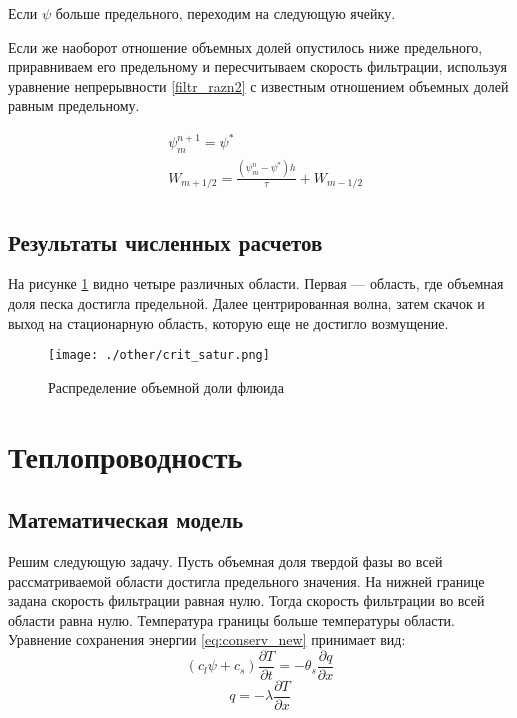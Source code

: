 \documentclass[12pt,a4paper]{article}
\newcommand{\pd}[2]{\frac{\partial #1}{\partial #2}}
\begin{document}
Если $\psi$ больше предельного, переходим на следующую ячейку.

Если же наоборот отношение объемных долей опустилось ниже предельного, приравниваем его предельному и пересчитываем скорость фильтрации, используя уравнение непрерывности \eqref{filtr_razn2} с известным отношением объемных долей равным предельному.

\begin{equation}
\begin{aligned} 
&\psi_{m}^{n+1} = \psi^* \\
&W_{m+1/2} = \frac{(\psi_m^n - \psi^*)h}{\tau} + W_{m-1/2} \\
\end{aligned}
\label{corr_razn}
\end{equation}

\subsection{Результаты численных расчетов}
На рисунке \ref{crit_perm_picture} видно четыре различных области. Первая --- область, где объемная доля песка достигла предельной. Далее центрированная волна, затем скачок и выход на стационарную область, которую еще не достигло возмущение. 
\begin{figure}[h!]
\begin{center}
\texttt{[image: ./other/crit\_satur.png]}
\caption{Распределение объемной доли флюида}
\label{crit_perm_picture}
\end{center}
\end{figure}
\newpage
\section{Теплопроводность}
\subsection{Математическая модель}
Решим следующую задачу. 
Пусть объемная доля твердой фазы во всей рассматриваемой области достигла предельного значения. На нижней границе задана скорость фильтрации равная нулю. Тогда скорость фильтрации во всей области равна нулю. Температура границы больше температуры области. Уравнение сохранения энергии \eqref{eq:conserv_new} принимает вид:
$$
(c_l \psi + c_s)\pd{T}{t} =-\theta_s \pd{q}{x}
$$
$$
q = -\lambda\pd{T}{x}
$$
\end{document}
